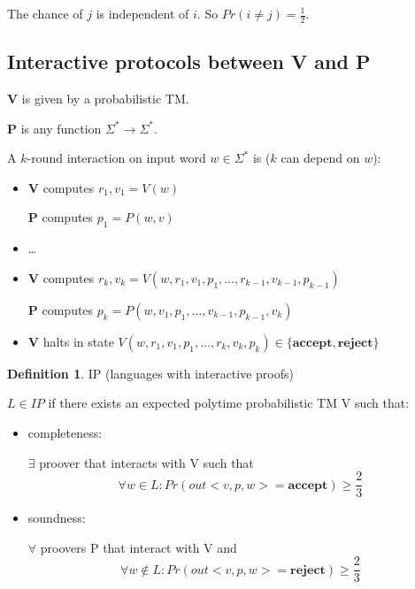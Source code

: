 \documentclass[a4paper,12pt]{article}
\theoremstyle{definition}
\newtheorem{definition}[counter]{Definition}
\theoremstyle{remark}
\begin{document}
The chance of $j$ is independent of $i$. So $Pr(i \neq j) = \frac{1}{2}$.

\subsection{Interactive protocols between \textbf{V} and \textbf{P}}
\textbf{V} is given by a probabilistic TM.

\textbf{P} is any function $\Sigma^* \to \Sigma^*$.

A $k$-round interaction on input word $w \in \Sigma^*$ is ($k$ can depend on $w$):

\begin{itemize}
    \item \textbf{V} computes $r_1, v_1 = V(w)$
    
    \textbf{P} computes $p_1 = P(w, v)$

    \item \dots
    
    \item \textbf{V} computes $r_k, v_k = V(w, r_1, v_1, p_1, \dots, r_{k-1}, v_{k-1}, p_{k-1})$
    
    \textbf{P} computes $p_k = P(w, v_1, p_1, \dots, v_{k-1}, p_{k-1}, v_k)$

    \item \textbf{V} halts in state $V(w, r_1, v_1, p_1, \dots, r_k, v_k, p_k) \in \{\textbf{accept}, \textbf{reject}\}$
\end{itemize}

\begin{definition}
    IP (languages with interactive proofs)

    $L \in IP $ if there exists an expected polytime probabilistic TM V such that:
    \begin{itemize}
        \item completeness:
        
        $\exists$ proover that interacts with V such that
        \begin{equation*}
            \forall w \in L: Pr(out<v,p,w>=\textbf{accept}) \geq \frac{2}{3}
        \end{equation*}
        \item soundness:
        
        $\forall$ proovers P that interact with V and
        \begin{equation*}
            \forall w \notin L: Pr(out<v,p,w>=\textbf{reject}) \geq \frac{2}{3}
        \end{equation*}
    \end{itemize}

\end{definition}
\end{document}

